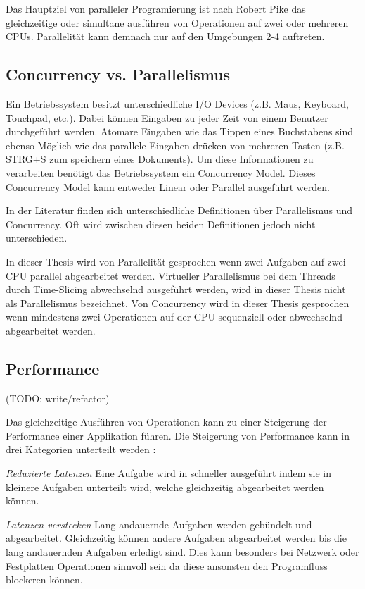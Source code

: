 Das Hauptziel von paralleler Programierung ist nach Robert Pike das gleichzeitige oder simultane ausführen von Operationen auf zwei oder mehreren CPUs.\cite[]{Pik2013} Parallelität kann demnach nur auf den Umgebungen 2-4 auftreten. 
 

\subsection{Concurrency vs. Parallelismus}

Ein Betriebssystem besitzt unterschiedliche I/O Devices (z.B. Maus, Keyboard, Touchpad, etc.). Dabei können Eingaben zu jeder Zeit von einem Benutzer durchgeführt werden. Atomare Eingaben wie das Tippen eines Buchstabens sind ebenso Möglich wie das parallele Eingaben drücken von mehreren Tasten (z.B. STRG+S zum speichern eines Dokuments). Um diese Informationen zu verarbeiten benötigt das Betriebssystem ein Concurrency Model. Dieses Concurrency Model kann entweder Linear oder Parallel ausgeführt werden. \cite[]{Pik2013}

In der Literatur finden sich unterschiedliche Definitionen über Parallelismus und Concurrency. Oft wird zwischen diesen beiden Definitionen jedoch nicht unterschieden.

In dieser Thesis wird von Parallelität gesprochen wenn zwei Aufgaben auf zwei CPU parallel abgearbeitet werden. Virtueller Parallelismus bei dem Threads durch Time-Slicing abwechselnd ausgeführt werden, wird in dieser Thesis nicht als Parallelismus bezeichnet. Von Concurrency wird in dieser Thesis gesprochen wenn mindestens zwei Operationen auf der CPU sequenziell oder abwechselnd abgearbeitet werden.





\subsection{Performance}
(TODO: write/refactor)

Das gleichzeitige Ausführen von Operationen kann zu einer Steigerung der Performance einer Applikation führen. Die Steigerung von Performance kann in drei Kategorien unterteilt werden \cite[p. 18]{Can08}:

\emph{Reduzierte Latenzen}
	Eine Aufgabe wird in schneller ausgeführt indem sie in kleinere Aufgaben unterteilt wird, welche gleichzeitig abgearbeitet werden können. \cite[p. 18]{Can08}

\emph{Latenzen verstecken}
	Lang andauernde Aufgaben werden gebündelt und abgearbeitet. Gleichzeitig können andere Aufgaben abgearbeitet werden bis die lang andauernden Aufgaben erledigt sind. Dies kann besonders bei Netzwerk oder Festplatten Operationen sinnvoll sein da diese ansonsten den Programfluss blockeren können.

